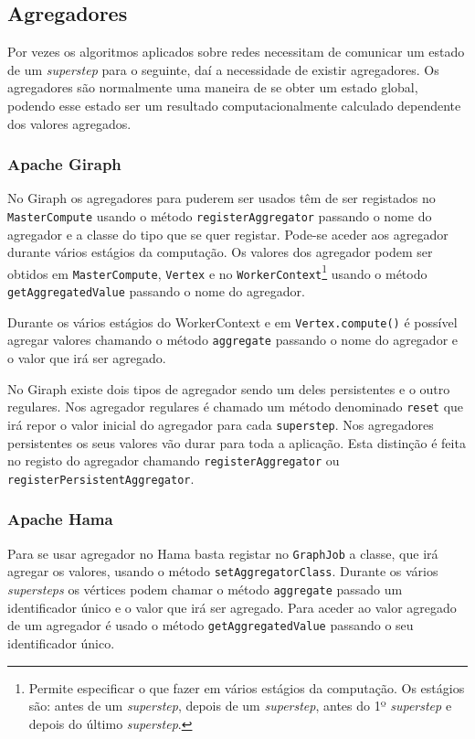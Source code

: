 \newpage

\subsection{Agregadores}
  Por vezes os algoritmos aplicados sobre redes necessitam de comunicar um 
estado de um \textit{superstep} para o seguinte, daí a necessidade de existir 
agregadores. Os agregadores são normalmente uma maneira de se obter um estado 
global, podendo esse estado ser um resultado computacionalmente calculado 
dependente dos valores agregados.

  \subsubsection*{Apache Giraph}
    No Giraph os agregadores para puderem ser usados têm de ser registados no \texttt{MasterCompute} usando o método \texttt{registerAggregator}
    passando o nome do agregador e a classe do tipo que se quer registar. Pode-se aceder aos agregador durante vários estágios da computação.
    Os valores dos agregador podem ser obtidos em \texttt{MasterCompute}, \texttt{Vertex} e no \texttt{WorkerContext}\footnote{Permite 
especificar o que fazer em vários estágios da computação. Os estágios são: 
antes de um \textit{superstep}, depois de um \textit{superstep}, antes do 1º \textit{superstep} e depois do 
último \textit{superstep}.} usando o método \texttt{getAggregatedValue} passando
    o nome do agregador.
    
    Durante os vários estágios do WorkerContext e em \texttt{Vertex.compute()} é possível agregar valores chamando o 
método \texttt{aggregate} passando o nome do agregador e o valor que irá ser agregado.
    
    No Giraph existe dois tipos de agregador sendo um deles persistentes e o outro regulares. Nos agregador regulares é chamado um método
    denominado \texttt{reset} que irá repor o valor inicial do agregador para cada \texttt{superstep}. Nos agregadores persistentes os seus valores vão durar
    para toda a aplicação. Esta distinção é feita no registo do agregador chamando \texttt{registerAggregator} 
    ou \texttt{registerPersistentAggregator}.
    
  \subsubsection*{Apache Hama}
    Para se usar agregador no Hama basta registar no \texttt{GraphJob} a classe, que irá agregar os valores, usando o método
    \texttt{setAggregatorClass}. Durante os vários \textit{supersteps} os vértices podem chamar o método \texttt{aggregate} passado um identificador único
    e o valor que irá ser agregado. Para aceder ao valor agregado de um agregador é usado o método \texttt{getAggregatedValue} passando o seu 
    identificador único.
    
